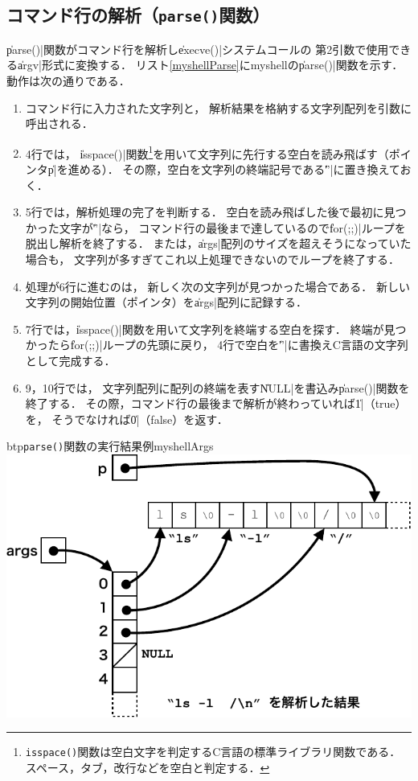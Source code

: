 \subsection{コマンド行の解析（\texttt{parse()}関数）}
\|parse()|関数がコマンド行を解析し\|execve()|システムコールの
第2引数で使用できる\|argv|形式に変換する．
リスト\ref{myshellParse}にmyshellの\|parse()|関数を示す．
動作は次の通りである．



\begin{enumerate}
\item コマンド行に入力された文字列と，
  解析結果を格納する文字列配列を引数に呼出される．
\item 4行では，
  \|isspace()|関数\footnote{
    \texttt{isspace()}関数は空白文字を判定するC言語の標準ライブラリ関数である．
    スペース，タブ，改行などを空白と判定する．
  }を用いて文字列に先行する空白を読み飛ばす（ポインタ\|p|を進める）．
  その際，空白を文字列の終端記号である\|'\0'|に置き換えておく．
\item 5行では，解析処理の完了を判断する．
  空白を読み飛ばした後で最初に見つかった文字が\|'\0'|なら，
  コマンド行の最後まで達しているので\|for(;;)|ループを脱出し解析を終了する．
  または，\|args|配列のサイズを超えそうになっていた場合も，
  文字列が多すぎてこれ以上処理できないのでループを終了する．
\item 処理が6行に進むのは，
  新しく次の文字列が見つかった場合である．
  新しい文字列の開始位置（ポインタ）を\|args|配列に記録する．
\item 7行では，\|isspace()|関数を用いて文字列を終端する空白を探す．
  終端が見つかったら\|for(;;)|ループの先頭に戻り，
  4行で空白を\|'\0'|に書換えC言語の文字列として完成する．
\item 9，10行では，
  文字列配列に配列の終端を表す\|NULL|を書込み\|parse()|関数を終了する．
  その際，コマンド行の最後まで解析が終わっていれば\|1|（true）を，
  そうでなければ\|0|（false）を返す．
\end{enumerate}

\begin{myfig}{btp}{\texttt{parse()}関数の実行結果例}{myshellArgs}
  \includegraphics[scale=0.8]{Fig/myshellArgs-crop.pdf}
\end{myfig}

